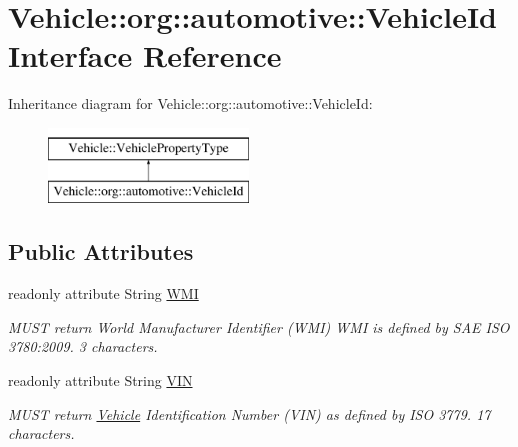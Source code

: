 \hypertarget{interfaceVehicle_1_1org_1_1automotive_1_1VehicleId}{\section{Vehicle\-:\-:org\-:\-:automotive\-:\-:Vehicle\-Id Interface Reference}
\label{interfaceVehicle_1_1org_1_1automotive_1_1VehicleId}
}
Inheritance diagram for Vehicle\-:\-:org\-:\-:automotive\-:\-:Vehicle\-Id\-:\begin{figure}[H]
\begin{center}
\leavevmode
\includegraphics[height=2.000000cm]{interfaceVehicle_1_1org_1_1automotive_1_1VehicleId}
\end{center}
\end{figure}
\subsection*{Public Attributes}
\begin{DoxyCompactItemize}
\item 
readonly attribute String \hyperlink{interfaceVehicle_1_1org_1_1automotive_1_1VehicleId_a0c6509eca8b31e2c2244f83c038debfb}{W\-M\-I}
\begin{DoxyCompactList}\small\item\em M\-U\-S\-T return World Manufacturer Identifier (W\-M\-I) W\-M\-I is defined by S\-A\-E I\-S\-O 3780\-:2009. 3 characters. \end{DoxyCompactList}\item 
readonly attribute String \hyperlink{interfaceVehicle_1_1org_1_1automotive_1_1VehicleId_a3771c1d174314e5534799d562810fde8}{V\-I\-N}
\begin{DoxyCompactList}\small\item\em M\-U\-S\-T return \hyperlink{namespaceVehicle}{Vehicle} Identification Number (V\-I\-N) as defined by I\-S\-O 3779. 17 characters. \end{DoxyCompactList}\end{DoxyCompactItemize}


